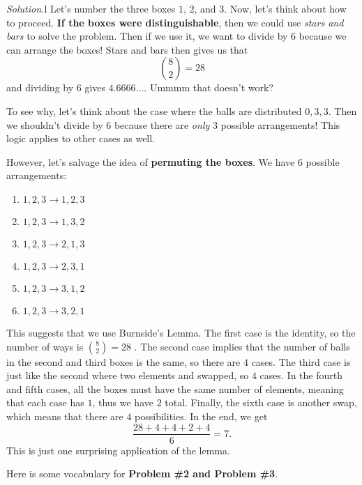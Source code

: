 \documentclass[11pt]{scrartcl}
\begin{document}
\color{orange} \textit{Solution.}\color{black}\color{white}l\color{black} Let's number the three boxes $1$, $2$, and $3$. Now, let's think about how to proceed. \color{blue} \textbf{If the boxes were distinguishable}\color{black}, then we could use \textit{stars and bars} to solve the problem. Then if we use it, we want to divide by $6$ because we can arrange the boxes! Stars and bars then gives us that \[\binom{8}{2} = 28\] and dividing by $6$ gives $4.6666\dots$. Ummmm that doesn't work?
\vspace{0.1cm}

To see why, let's think about the case where the balls are distributed $0,3,3$. Then we shouldn't divide by $6$ because there are \textit{only} $3$ possible arrangements! This logic applies to other cases as well.
\vspace{0.1cm}

However, let's salvage the idea of \color{blue} \textbf{permuting the boxes}\color{black}. We have $6$ possible arrangements:
\begin{enumerate}
    \item $1,2,3 \rightarrow 1,2,3$
    \item $1,2,3 \rightarrow 1,3,2$
    \item $1,2,3 \rightarrow 2,1,3$
    \item $1,2,3 \rightarrow 2,3,1$
    \item $1,2,3 \rightarrow 3,1,2$
    \item $1,2,3 \rightarrow 3,2,1$
\end{enumerate}

This suggests that we use Burnside's Lemma. The first case is the identity, so the number of ways is \boldmath $\binom{8}{2}=28$ \unboldmath. The second case implies that the number of balls in the second and third boxes is the same, so there are \boldmath $4$ \unboldmath cases. The third case is just like the second where two elements and swapped, so \boldmath $4$ \unboldmath cases. In the fourth and fifth cases, all the boxes must have the same number of elements, meaning that each case has $1$, thus we have \boldmath $2$ \unboldmath total. Finally, the sixth case is another swap, which means that there are \boldmath $4$ \unboldmath possibilities. In the end, we get \[\dfrac{28+4+4+2+4}{6} = \boxed{7}.\] This is just one surprising application of the lemma.

\vspace{0.5cm}

Here is some vocabulary for \textbf{Problem \#2 and Problem \#3}.
\end{document}
